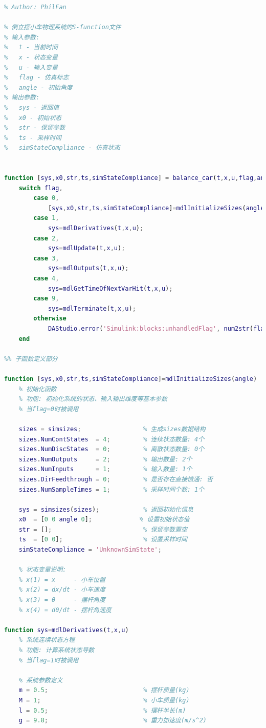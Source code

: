 \documentclass[12pt,a4paper,UTF8]{article}
\begin{document}
\begin{lstlisting}[language=Matlab]
% Date: 2024-11-30
% Author: PhilFan 

% 倒立摆小车物理系统的S-function文件
% 输入参数:
%   t - 当前时间
%   x - 状态变量
%   u - 输入变量
%   flag - 仿真标志
%   angle - 初始角度
% 输出参数:
%   sys - 返回值
%   x0 - 初始状态
%   str - 保留参数
%   ts - 采样时间
%   simStateCompliance - 仿真状态


function [sys,x0,str,ts,simStateCompliance] = balance_car(t,x,u,flag,angle)
    switch flag,
        case 0,
            [sys,x0,str,ts,simStateCompliance]=mdlInitializeSizes(angle);
        case 1,
            sys=mdlDerivatives(t,x,u);
        case 2,
            sys=mdlUpdate(t,x,u);
        case 3,
            sys=mdlOutputs(t,x,u);
        case 4,
            sys=mdlGetTimeOfNextVarHit(t,x,u);
        case 9,
            sys=mdlTerminate(t,x,u);
        otherwise
            DAStudio.error('Simulink:blocks:unhandledFlag', num2str(flag));
    end

%% 子函数定义部分

function [sys,x0,str,ts,simStateCompliance]=mdlInitializeSizes(angle)
    % 初始化函数
    % 功能: 初始化系统的状态、输入输出维度等基本参数
    % 当flag=0时被调用

    sizes = simsizes;                 % 生成sizes数据结构
    sizes.NumContStates  = 4;         % 连续状态数量: 4个
    sizes.NumDiscStates  = 0;         % 离散状态数量: 0个
    sizes.NumOutputs     = 2;         % 输出数量: 2个
    sizes.NumInputs      = 1;         % 输入数量: 1个
    sizes.DirFeedthrough = 0;         % 是否存在直接馈通: 否
    sizes.NumSampleTimes = 1;         % 采样时间个数: 1个

    sys = simsizes(sizes);            % 返回初始化信息
    x0  = [0 0 angle 0];             % 设置初始状态值
    str = [];                         % 保留参数置空
    ts  = [0 0];                      % 设置采样时间
    simStateCompliance = 'UnknownSimState';

    % 状态变量说明:
    % x(1) = x     - 小车位置
    % x(2) = dx/dt - 小车速度
    % x(3) = θ     - 摆杆角度
    % x(4) = dθ/dt - 摆杆角速度

function sys=mdlDerivatives(t,x,u)
    % 系统连续状态方程
    % 功能: 计算系统状态导数
    % 当flag=1时被调用

    % 系统参数定义
    m = 0.5;                          % 摆杆质量(kg)
    M = 1;                            % 小车质量(kg)
    l = 0.5;                          % 摆杆半长(m)
    g = 9.8;                          % 重力加速度(m/s^2)


\end{lstlisting}
\end{document}
